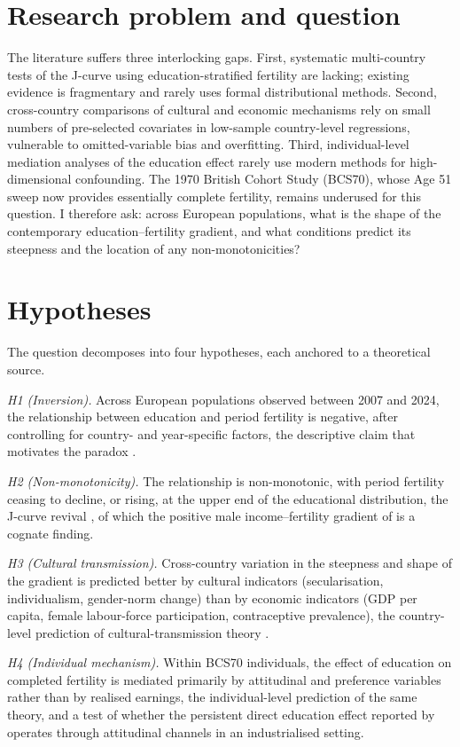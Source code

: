 \documentclass[12pt,a4paper]{report}
\begin{document}
\section{Research problem and question}
The literature suffers three interlocking gaps. First, systematic multi-country tests of the
J-curve using education-stratified fertility are lacking; existing evidence is fragmentary and
rarely uses formal distributional methods. Second, cross-country comparisons of cultural and
economic mechanisms rely on small numbers of pre-selected covariates in low-sample country-level
regressions, vulnerable to omitted-variable bias and overfitting. Third, individual-level
mediation analyses of the education effect rarely use modern methods for high-dimensional
confounding. The 1970 British Cohort Study (BCS70), whose Age 51 sweep now provides essentially
complete fertility, remains underused for this question. I therefore ask: across European
populations, what is the shape of the contemporary education--fertility gradient, and what
conditions predict its steepness and the location of any non-monotonicities?

\section{Hypotheses}
The question decomposes into four hypotheses, each anchored to a theoretical source.

\textit{H1 (Inversion).} Across European populations observed between 2007 and 2024, the
relationship between education and period fertility is negative, after controlling for
country- and year-specific factors, the descriptive claim that motivates the paradox
\citep{vining1986}.

\textit{H2 (Non-monotonicity).} The relationship is non-monotonic, with period fertility ceasing to
decline, or rising, at the upper end of the educational distribution, the J-curve revival
\citep{stulpbarrett2016}, of which the positive male income--fertility gradient of
\citet{hopcroft2006} is a cognate finding.

\textit{H3 (Cultural transmission).} Cross-country variation in the steepness and shape of the
gradient is predicted better by cultural indicators (secularisation, individualism, gender-norm
change) than by economic indicators (GDP per capita, female labour-force participation,
contraceptive prevalence), the country-level prediction of cultural-transmission theory
\citep{bongaartswatkins1996,colleran2016}.

\textit{H4 (Individual mechanism).} Within BCS70 individuals, the effect of education on
completed fertility is mediated primarily by attitudinal and preference variables rather than
by realised earnings, the individual-level prediction of the same theory, and a test of whether the
persistent direct education effect reported by \citet{snopkowski2016} operates through attitudinal
channels in an industrialised setting.
\end{document}
